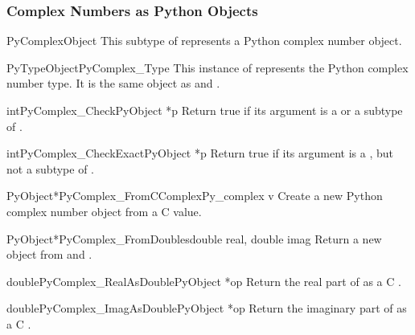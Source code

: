\subsubsection{Complex Numbers as Python Objects}

\begin{ctypedesc}{PyComplexObject}
  This subtype of  represents a Python complex number
  object.
\end{ctypedesc}

\begin{cvardesc}{PyTypeObject}{PyComplex_Type}
  This instance of  represents the Python complex
  number type. It is the same object as  and
  .
\end{cvardesc}

\begin{cfuncdesc}{int}{PyComplex_Check}{PyObject *p}
  Return true if its argument is a  or a
  subtype of .
\end{cfuncdesc}

\begin{cfuncdesc}{int}{PyComplex_CheckExact}{PyObject *p}
  Return true if its argument is a , but not a
  subtype of .
\end{cfuncdesc}

\begin{cfuncdesc}{PyObject*}{PyComplex_FromCComplex}{Py_complex v}
  Create a new Python complex number object from a C
   value.
\end{cfuncdesc}

\begin{cfuncdesc}{PyObject*}{PyComplex_FromDoubles}{double real, double imag}
  Return a new  object from  and
  .
\end{cfuncdesc}

\begin{cfuncdesc}{double}{PyComplex_RealAsDouble}{PyObject *op}
  Return the real part of  as a C .
\end{cfuncdesc}

\begin{cfuncdesc}{double}{PyComplex_ImagAsDouble}{PyObject *op}
  Return the imaginary part of  as a C .
\end{cfuncdesc}

